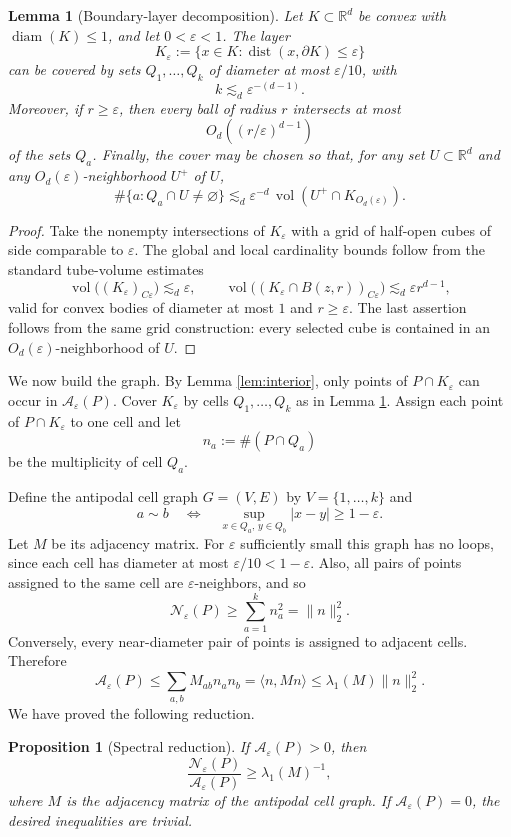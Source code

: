 \documentclass[11pt]{article}
\newtheorem{lemma}[theorem]{Lemma}
\newtheorem{proposition}[theorem]{Proposition}
\newcommand{\R}{\mathbb R}
\newcommand{\eps}{\varepsilon}
\newcommand{\diam}{\operatorname{diam}}
\newcommand{\dist}{\operatorname{dist}}
\newcommand{\vol}{\operatorname{vol}}
\newcommand{\cN}{\mathcal N}
\newcommand{\cA}{\mathcal A}
\begin{document}
\begin{lemma}[Boundary-layer decomposition]\label{lem:cover}
Let $K\subset\R^d$ be convex with $\diam(K)\le1$, and let $0<\eps<1$.  The layer
\[
   K_\eps:=\{x\in K:\dist(x,\partial K)\le\eps\}
\]
can be covered by sets $Q_1,\ldots,Q_k$ of diameter at most $\eps/10$, with
\[
   k\lesssim_d \eps^{-(d-1)}.
\]
Moreover, if $r\ge\eps$, then every ball of radius $r$ intersects at most
\[
   O_d\!\left((r/\eps)^{d-1}\right)
\]
of the sets $Q_a$.  Finally, the cover may be chosen so that, for any set $U\subset\R^d$ and any $O_d(\eps)$-neighborhood $U^+$ of $U$,
\[
   \#\{a:Q_a\cap U\ne\varnothing\}
   \lesssim_d \eps^{-d}\,\vol(U^+\cap K_{O_d(\eps)}).
\]
\end{lemma}

\begin{proof}
Take the nonempty intersections of $K_\eps$ with a grid of half-open cubes of side comparable to $\eps$.  The global and local cardinality bounds follow from the standard tube-volume estimates
\[
   \vol\big((K_\eps)_{C\eps}\big)\lesssim_d \eps,
   \qquad
   \vol\big((K_\eps\cap B(z,r))_{C\eps}\big)\lesssim_d \eps r^{d-1},
\]
valid for convex bodies of diameter at most $1$ and $r\ge\eps$.  The last assertion follows from the same grid construction: every selected cube is contained in an $O_d(\eps)$-neighborhood of $U$.
\end{proof}

\smallskip
\noindent
We now build the graph.  By Lemma \ref{lem:interior}, only points of $P\cap K_\eps$ can occur in $\cA_\eps(P)$.  Cover $K_\eps$ by cells $Q_1,\ldots,Q_k$ as in Lemma \ref{lem:cover}.  Assign each point of $P\cap K_\eps$ to one cell and let
\[
   n_a:=\#(P\cap Q_a)
\]
be the multiplicity of cell $Q_a$.

\bigskip
\noindent
Define the antipodal cell graph $G=(V,E)$ by $V=\{1,\ldots,k\}$ and
\[
   a\sim b
   \quad\Longleftrightarrow\quad
   \sup_{x\in Q_a,\,y\in Q_b}|x-y|\ge1-\eps.
\]
Let $M$ be its adjacency matrix.  For $\eps$ sufficiently small this graph has no loops, since each cell has diameter at most $\eps/10<1-\eps$.  Also, all pairs of points assigned to the same cell are $\eps$-neighbors, and so
\[
   \cN_\eps(P)\ge \sum_{a=1}^k n_a^2=\|n\|_2^2.
\]
Conversely, every near-diameter pair of points is assigned to adjacent cells.  Therefore
\[
   \cA_\eps(P)
   \le
   \sum_{a,b}M_{ab}n_an_b
   =\langle n,Mn\rangle
   \le
   \lambda_1(M)\|n\|_2^2.
\]
We have proved the following reduction.

\begin{proposition}[Spectral reduction]\label{prop:spectral-reduction}
If $\cA_\eps(P)>0$, then
\[
   \frac{\cN_\eps(P)}{\cA_\eps(P)}
   \ge
   \lambda_1(M)^{-1},
\]
where $M$ is the adjacency matrix of the antipodal cell graph.  If $\cA_\eps(P)=0$, the desired inequalities are trivial.
\end{proposition}
\end{document}
